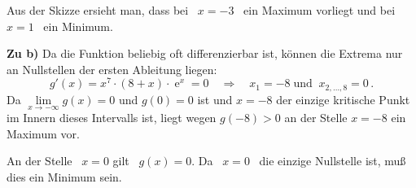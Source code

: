 {\begin{enumerate}
	Aus der Skizze ersieht man, dass bei \ $x=-3$ \ ein Maximum vorliegt und bei \ $x=1$ \ ein Minimum.
\end{enumerate}

\medskip
\textbf{Zu b)} Da die Funktion beliebig oft differenzierbar ist, können die Extrema nur an Nullstellen der ersten Ableitung liegen:
\[
g'(x) = x^{7}\cdot(8+x)\cdot\operatorname{e}^x = 0 \quad \Longrightarrow \quad  x_1 = -8  \; \text{und} \;\; x_{2,...,8} = 0\,.
\]
Da $\lim\limits_{x\rightarrow-\infty} g(x)=0$ und $g(0)=0$ ist und $x=-8$ der einzige kritische Punkt im Innern dieses Intervalls ist, liegt wegen $g(-8) > 0$ an der Stelle $x=-8$ ein Maximum vor. 

An der Stelle \ $x=0$ gilt \ $g(x)= 0$. Da \ $x=0$ \ die einzige Nullstelle ist, muß dies ein Minimum sein.
}

